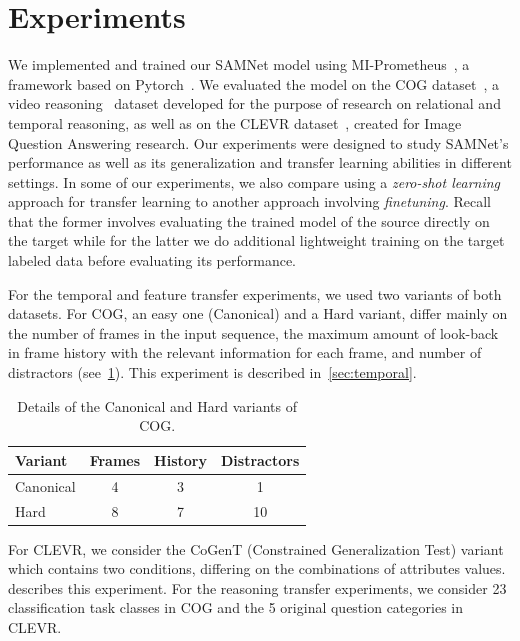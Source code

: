 \section{Experiments}
\label{sec:experiments}
We implemented and trained our SAMNet model using MI-Prometheus~\cite{kornuta2018accelerating}, a framework based on Pytorch~\cite{paszke2017automatic}. We evaluated the model on the COG dataset~\cite{yang2018dataset}, a video reasoning~\cite{mogadala2019trends} dataset developed for the purpose of research on relational and temporal reasoning, as well as on the CLEVR dataset~\cite{johnson2017clevr}, created for Image Question Answering research.
Our experiments were designed to study SAMNet's performance as well as its generalization and transfer learning abilities in different settings.
In some of our experiments, we also compare using a \emph{zero-shot learning} approach  for transfer learning to another approach
involving \emph{finetuning}.
Recall that the former involves evaluating the trained model of the source directly on the target while for the latter we do additional lightweight 
training on the target labeled data before evaluating its performance. 

For the temporal and feature transfer experiments, we used two variants of both datasets.
For COG, an easy one (Canonical) and a Hard variant, differ mainly on the number of frames in the input sequence, the maximum amount of look-back in frame history with the relevant information for each frame, and number of distractors (see~\cref{tab:cog_variants}).
This experiment is described in~\cref{sec:temporal}.
\begin{table}[ht]
	\centering
		\begin{tabular}{lccc}
			\toprule
			Variant	& Frames & History	& Distractors \\ 
			\midrule
			Canonical & 4 & 3 & 1\\	
			Hard  & 8 & 7 & 10\\
			\bottomrule	
		\end{tabular}
	\caption{Details of the Canonical and Hard variants of COG.}
	\label{tab:cog_variants}
\end{table}\vspace{5pt}

For CLEVR, we consider the CoGenT (Constrained Generalization Test) variant which contains two conditions, differing on the combinations of attributes values.
 describes this experiment.
For the reasoning transfer experiments, we consider 23 classification task classes in COG and the 5 original question categories in CLEVR.

